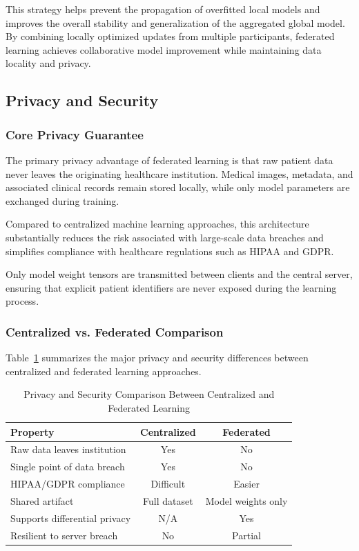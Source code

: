 This strategy helps prevent the propagation of overfitted local models and improves the overall stability and generalization of the aggregated global model. By combining locally optimized updates from multiple participants, federated learning achieves collaborative model improvement while maintaining data locality and privacy.

\subsection{Privacy and Security}

\subsubsection{Core Privacy Guarantee}

The primary privacy advantage of federated learning is that raw patient data never leaves the originating healthcare institution. Medical images, metadata, and associated clinical records remain stored locally, while only model parameters are exchanged during training.

Compared to centralized machine learning approaches, this architecture substantially reduces the risk associated with large-scale data breaches and simplifies compliance with healthcare regulations such as HIPAA and GDPR.

Only model weight tensors are transmitted between clients and the central server, ensuring that explicit patient identifiers are never exposed during the learning process.

\subsubsection{Centralized vs. Federated Comparison}

Table~\ref{tab:centralized_federated} summarizes the major privacy and security differences between centralized and federated learning approaches.

\begin{table}[H]
	\centering
	\caption{Privacy and Security Comparison Between Centralized and Federated Learning}
	\label{tab:centralized_federated}
	\begin{tabular}{|l|c|c|}
		\hline
		\textbf{Property} & \textbf{Centralized} & \textbf{Federated} \\
		\hline
		Raw data leaves institution & Yes & No \\
		Single point of data breach & Yes & No \\
		HIPAA/GDPR compliance & Difficult & Easier \\
		Shared artifact & Full dataset & Model weights only \\
		Supports differential privacy & N/A & Yes \\
		Resilient to server breach & No & Partial \\
		\hline
	\end{tabular}
\end{table}

